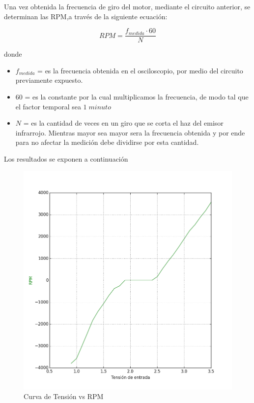 \documentclass[11pt, a4paper]{article}
\begin{document}
Una vez obtenida la frecuencia de giro del motor, mediante el circuito  anterior, se determinan las RPM,a través de la siguiente ecuación:

\begin{equation}
	RPM = \frac{f_{medida} \cdot 60}{N}
\end{equation}

donde

\begin{itemize}
	\item $f_{medida}$ = es la frecuencia obtenida en el osciloscopio, por medio del circuito previamente expuesto.
	\item $60$ = es la constante por la cual multiplicamos la frecuencia, de modo tal que el factor temporal sea $1 \; minuto$ 
	\item $N$ = es la cantidad de veces en un giro que se corta el haz del emisor infrarrojo. Mientras mayor sea mayor sera la frecuencia obtenida y por ende para no afectar la medición debe dividirse por esta cantidad.
\end{itemize}

Los resultados se exponen a continuación

\begin{figure}[h]
	\centering
	\includegraphics[width=15cm]{Imagenes/rpm.png}
	\caption{Curva de Tensión vs RPM}
	\label{fig:rpm}
\end{figure} 
\end{document}

